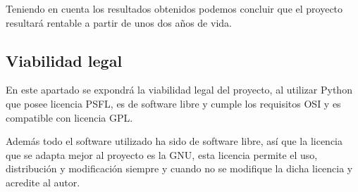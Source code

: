 	Teniendo en cuenta los resultados obtenidos podemos concluir que el proyecto resultará rentable a partir de unos dos años de vida.
	
\subsection{Viabilidad legal}

	En este apartado se expondrá la viabilidad legal del proyecto, al utilizar Python que posee licencia PSFL\cite{licencia}, es de software libre y cumple los requisitos OSI y es compatible con licencia GPL.
	
	Además todo el software utilizado ha sido de software libre, así que la licencia que se adapta mejor al proyecto es la GNU\cite{gnu}, esta licencia permite el uso, distribución y modificación siempre y cuando no se modifique la dicha licencia y acredite al autor.
	
	